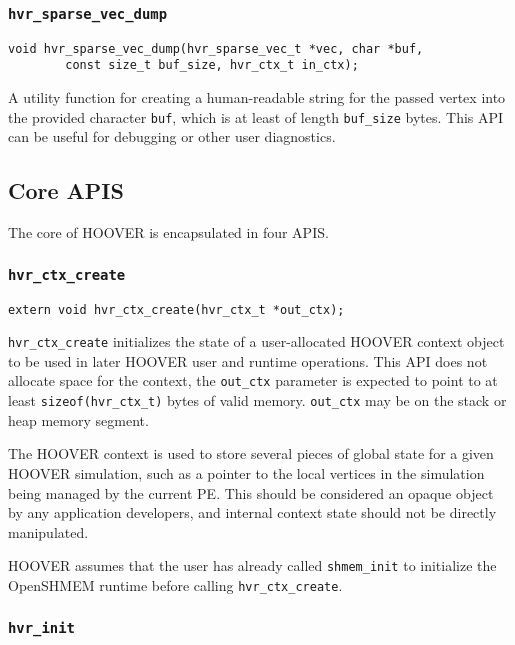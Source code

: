 \subsubsection{\texttt{hvr\_sparse\_vec\_dump}}

\begin{verbatim}
void hvr_sparse_vec_dump(hvr_sparse_vec_t *vec, char *buf,
        const size_t buf_size, hvr_ctx_t in_ctx);
\end{verbatim}

A utility function for creating a human-readable string for the passed vertex
into the provided character \texttt{buf}, which is at least of length
\texttt{buf\_size} bytes. This API can be useful for debugging or other user
diagnostics.

\subsection{Core APIS}

The core of HOOVER is encapsulated in four APIS.

\subsubsection{\texttt{hvr\_ctx\_create}}

\begin{verbatim}
extern void hvr_ctx_create(hvr_ctx_t *out_ctx);
\end{verbatim}

\texttt{hvr\_ctx\_create} initializes the state of a user-allocated HOOVER
context object to be used in later HOOVER user and runtime operations. This API
does not allocate space for the context, the \texttt{out\_ctx} parameter is
expected to point to at least \texttt{sizeof(hvr\_ctx\_t)} bytes of valid
memory. \texttt{out\_ctx} may be on the stack or heap memory segment.

The HOOVER context is used to store several pieces of global state for a given HOOVER
simulation, such as a pointer to the local vertices in the simulation being
managed by the current PE. This should be considered an opaque object by any
application developers, and internal context state should not be directly
manipulated.

HOOVER assumes that the user has already called \texttt{shmem\_init} to
initialize the OpenSHMEM runtime before calling \texttt{hvr\_ctx\_create}.

\subsubsection{\texttt{hvr\_init}}

